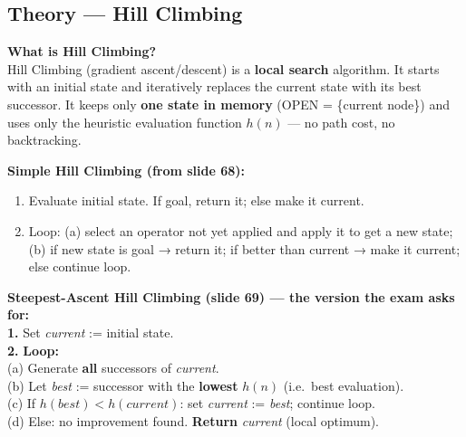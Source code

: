 \documentclass[12pt, a4paper]{article}
\begin{document}
\subsection{Theory — Hill Climbing}

\noindent\textbf{What is Hill Climbing?}\\
Hill Climbing (gradient ascent/descent) is a \textbf{local search} algorithm. It starts with an initial state and iteratively replaces the current state with its best successor. It keeps only \textbf{one state in memory} (OPEN = \{current node\}) and uses only the heuristic evaluation function $h(n)$ — no path cost, no backtracking.

\vspace{0.4em}

\noindent\textbf{Simple Hill Climbing (from slide 68):}
\begin{enumerate}[noitemsep]
  \item Evaluate initial state. If goal, return it; else make it current.
  \item Loop: (a) select an operator not yet applied and apply it to get a new state; (b) if new state is goal → return it; if better than current → make it current; else continue loop.
\end{enumerate}

\vspace{0.4em}

\begin{mdframed}[style=notesframe]
\textbf{Steepest-Ascent Hill Climbing (slide 69) — the version the exam asks for:}\\[0.3em]
\textbf{1.} Set \textit{current} := initial state.\\
\textbf{2.} \textbf{Loop:}\\
\hspace{1.5em}(a) Generate \textbf{all} successors of \textit{current}.\\
\hspace{1.5em}(b) Let \textit{best} := successor with the \textbf{lowest} $h(n)$ (i.e.\ best evaluation).\\
\hspace{1.5em}(c) If $h(\textit{best}) < h(\textit{current})$: set \textit{current} := \textit{best}; continue loop.\\
\hspace{1.5em}(d) Else: no improvement found. \textbf{Return} \textit{current} (local optimum).
\end{mdframed}
\end{document}
